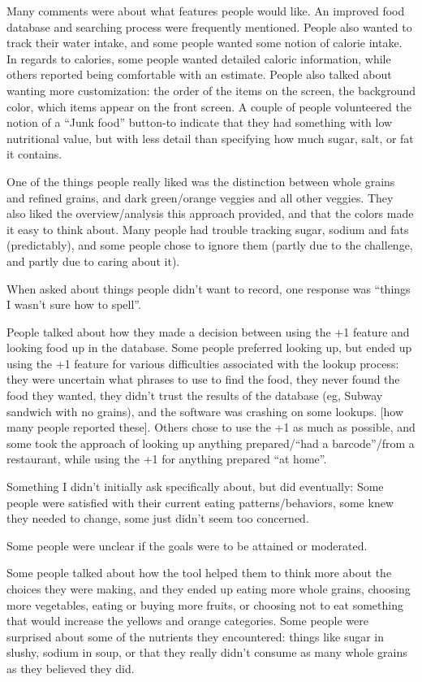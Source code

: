 Many comments were about what features people would like. An improved food database and searching process were frequently mentioned. People also wanted to track their water intake, and some people wanted some notion of calorie intake. In regards to calories, some people wanted detailed caloric information, while others reported being comfortable with an estimate. People also talked about wanting more customization: the order of the items on the screen, the background color, which items appear on the front screen. A couple of people volunteered the notion of a ``Junk food'' button-to indicate that they had something with low nutritional value, but with less detail than specifying how much sugar, salt, or fat it contains. 

One of the things people really liked was the distinction between whole grains and refined grains, and dark green/orange veggies and all other veggies. They also liked the overview/analysis this approach provided, and that the colors made it easy to think about. Many people had trouble tracking sugar, sodium and fats (predictably), and some people chose to ignore them (partly due to the challenge, and partly due to caring about it). 

When asked about things people didn't want to record, one response was ``things I wasn't sure how to spell''. 

People talked about how they made a decision between using the +1 feature and looking food up in the database. Some people preferred looking up, but ended up using the +1 feature for various difficulties associated with the lookup process: they were uncertain what phrases to use to find the food, they never found the food they wanted, they didn't trust the results of the database (eg, Subway sandwich with no grains), and the software was crashing on some lookups. [how many people reported these]. Others chose to use the +1 as much as possible, and some took the approach of looking up anything prepared/``had a barcode''/from a restaurant, while using the +1 for anything prepared ``at home''. 

Something I didn't initially ask specifically about, but did eventually: Some people were satisfied with their current eating patterns/behaviors, some knew they needed to change, some just didn't seem too concerned. 

Some people were unclear if the goals were to be attained or moderated. 

Some people talked about how the tool helped them to think more about the choices they were making, and they ended up eating more whole grains, choosing more vegetables, eating or buying more fruits, or choosing not to eat something that would increase the yellows and orange categories. Some people were surprised about some of the nutrients they encountered: things like sugar in slushy, sodium in soup, or that they really didn't consume as many whole grains as they believed they did. 

